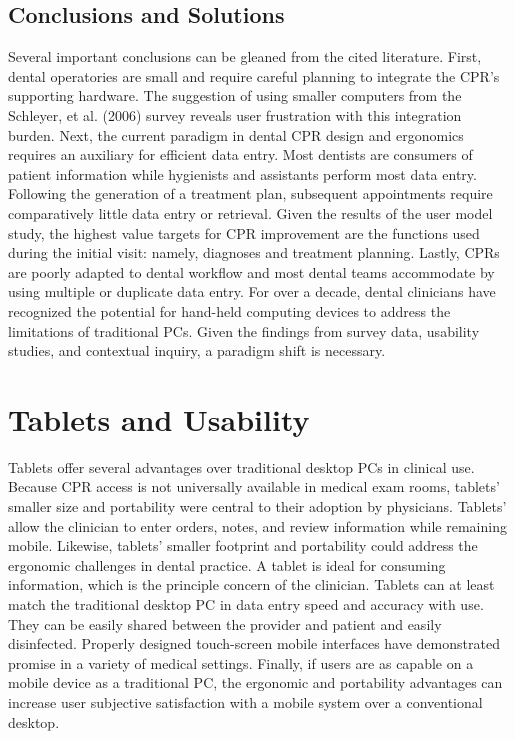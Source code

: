 \documentclass[11pt]{article}
\begin{document}
\subsection{Conclusions and Solutions}
Several important conclusions can be gleaned from the cited literature. First, dental operatories are small and require careful planning to integrate the CPR's supporting hardware. The suggestion of using smaller computers from the Schleyer, et al. (2006) survey reveals user frustration with this integration burden. Next, the current paradigm in dental CPR design and ergonomics requires an auxiliary for efficient data entry. Most dentists are consumers of patient information while hygienists and assistants perform most data entry. Following the generation of a treatment plan, subsequent appointments require comparatively little data entry or retrieval. Given the results of the user model study, the highest value targets for CPR improvement are the functions used during the initial visit: namely, diagnoses and treatment planning. Lastly, CPRs are poorly adapted to dental workflow and most dental teams accommodate by using multiple or duplicate data entry. For over a decade, dental clinicians have recognized the potential for hand-held computing devices to address the limitations of traditional PCs\cite{Taylor2002Handheld-comput,Jablow2003Your-practice-i}. Given the findings from survey data, usability studies, and contextual inquiry, a paradigm shift is necessary.


\section{Tablets and Usability}
Tablets offer several advantages over traditional desktop PCs in clinical use. Because CPR access is not universally available in medical exam rooms, tablets' smaller size and portability were central to their adoption by physicians. Tablets' allow the clinician to enter orders, notes, and review information while remaining mobile. Likewise, tablets' smaller footprint and portability could address the ergonomic challenges in dental practice. A tablet is ideal for consuming information, which is the principle concern of the clinician. Tablets can at least match the traditional desktop PC in data entry speed and accuracy with use\cite{Kirby1996The-PEN--PAD-da,Mackenzi2002Text-entry-for-}. They can be easily shared between the provider and patient and easily disinfected\cite{Mayrhofer2007Pen-based-Elect}. Properly designed touch-screen mobile interfaces have demonstrated promise in a variety of medical settings\cite{Haller2009Handheld-vs.-la,Mulligen1998Clinical-data-e,Baumgart2005Personal-digita,Lu2005A-review-and-a-,Seneviratne2010Improving-stylu}. Finally, if users are as capable on a mobile device as a traditional PC, the ergonomic and portability advantages can increase user subjective satisfaction with a mobile system over a conventional desktop\cite{Cole2006A-comparative-s}.
\end{document}
